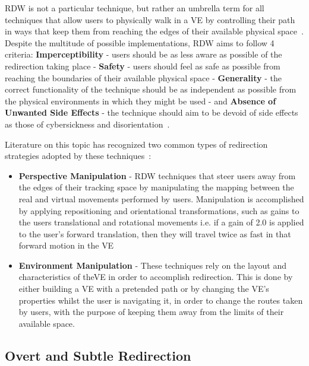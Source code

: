 \gls{RDW} is not a particular technique, but rather an umbrella term for all techniques that allow users to physically walk in a 
\gls{VE} by controlling their path in ways that keep them from reaching the edges of their available physical space~\cite{Nilsson2018}. 
Despite the multitude of possible implementations, \gls{RDW} aims to follow 4 criteria: \textbf{Imperceptibility} - users should be as less aware 
as possible of the redirection taking place - \textbf{Safety} - users should feel as safe as possible from reaching the boundaries of their 
available physical space - \textbf{Generality} - the correct functionality of the technique should be as independent as possible from the physical 
environments in which they might be used - and \textbf{Absence of Unwanted Side Effects} - the technique should aim to be devoid of 
side effects as those of cybersickness and disorientation~\cite{8255772}.

Literature on this topic has recognized two common types of redirection strategies adopted by these techniques~\cite{8255772, Nilsson2018}:
\begin{itemize}
    \item \textbf{Perspective Manipulation} - 
    RDW techniques that steer users away from the edges of their tracking space by manipulating the mapping between the real 
    and virtual movements performed by users. Manipulation is accomplished by applying repositioning and orientational transformations, such as gains to 
    the users translational and rotational movements
    i.e. if a gain of 2.0 is applied to the user's 
    forward translation, then they will travel twice as fast in that forward motion in the \gls{VE}
    
    \item \textbf{Environment Manipulation} - 
    These techniques rely on the layout and characteristics of the\gls{VE} in order to accomplish redirection. This is done by either 
    building a \gls{VE} with a pretended path or by changing the \gls{VE}'s properties whilst the user is navigating it, in order to change 
    the routes taken by users, with the purpose of keeping them away from the limits of their available space.
\end{itemize}

\subsection{Overt and Subtle Redirection}
\label{sec:ov-sub-redirection}

